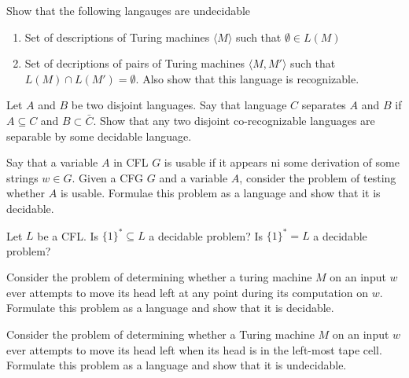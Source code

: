 \documentclass[12pt]{exam}
\begin{document}
\begin{questions}
  \question{}
  Show that the following langauges are undecidable

  \begin{enumerate}
    \item Set of descriptions of Turing machines $\langle M \rangle$ such that $\emptyset \in L(M)$

    \item Set of decriptions of pairs of Turing machines $\langle M, M' \rangle$ such that $L(M)\cap L(M') = \emptyset$.
          Also show that this language is recognizable.

  \end{enumerate}


  \question{}
  Let $A$ and $B$ be two disjoint languages. Say that language $C$ separates $A$ and $B$ if $A\subseteq C$ and $B\subset \bar C$. Show that any two disjoint co-recognizable languages are separable by some decidable language.


  \question{}
  Say that a variable $A$ in CFL $G$ is usable if it appears ni some derivation of some strings $w\in G$. Given a CFG $G$ and a variable $A$, consider the problem of testing whether $A$ is usable.
  Formulae this problem as a language and show that it is decidable.


  \question{}
  Let $L$ be a CFL. Is $\{1\}^{*}\subseteq L$ a decidable problem?
  Is $\{1\}^{*}=L$ a decidable problem?

  \question{}
  Consider the problem of determining whether a turing machine $M$ on an input $w$ ever attempts to move its head left at any point during its computation on $w$. Formulate this problem as a language and show that it is decidable.


  \question{}
  Consider the problem of determining whether a Turing machine $M$ on an input $w$ ever
  attempts to move its head left when its head is in the left-most tape cell.
  Formulate this problem as a language and show that it is undecidable.

\end{questions}
\end{document}

